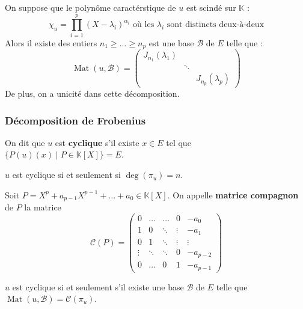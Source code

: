 	
	\begin{theorem}
		On suppose que le polynôme caractérstique de $u$ est scindé sur $\mathbb{K}$ :
		\[ \chi_u = \prod_{i=1}^p (X - \lambda_i)^{\alpha_i} \text{ où les } \lambda_i \text{ sont distincts deux-à-deux} \]
		Alors il existe des entiers $n_1 \geq \dots \geq n_p$ est une base $\mathcal{B}$ de $E$ telle que :
		\[ \operatorname{Mat}(u, \mathcal{B}) = \begin{pmatrix} J_{n_1}(\lambda_1) & & \\ & \ddots & \\ & & J_{n_p}(\lambda_p) \end{pmatrix} \]
		De plus, on a unicité dans cette décomposition.
	\end{theorem}
	
	\subsubsection{Décomposition de Frobenius}
	
	
	\begin{definition}
		On dit que $u$ est \textbf{cyclique} s'il existe $x \in E$ tel que $\{ P(u)(x) \mid P \in \mathbb{K}[X] \} = E$.
	\end{definition}
	
	\begin{proposition}
		$u$ est cyclique si et seulement si $\deg(\pi_u) = n$.
	\end{proposition}
	
	\begin{definition}
		Soit $P = X^p + a_{p-1} X^{p-1} + \dots + a_0 \in \mathbb{K}[X]$. On appelle \textbf{matrice compagnon} de $P$ la matrice
		\[ \mathcal{C}(P) = \begin{pmatrix} 0 & \dots & \dots & 0 & -a_0 \\ 1 & 0 & \ddots & \vdots & -a_1 \\ 0 & 1 & \ddots & \vdots & \vdots \\ \vdots & \ddots & \ddots & 0 & -a_{p-2} \\ 0 & \dots & 0 & 1 & -a_{p-1} \end{pmatrix} \]
	\end{definition}
	
	\begin{proposition}
		$u$ est cyclique si et seulement s'il existe une base $\mathcal{B}$ de $E$ telle que $\operatorname{Mat}(u, \mathcal{B}) = \mathcal{C}(\pi_u)$.
	\end{proposition}
	
